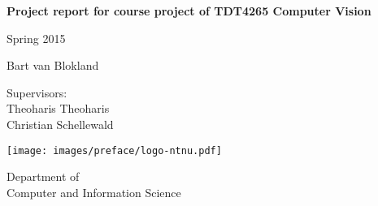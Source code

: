 \documentclass[12pt,a4paper,oneside]{report}
\begin{document}

\thispagestyle{empty}

\begin{center}
    {\Huge\textbf{Project report for course project of TDT4265 Computer Vision}} \\
    \medskip

    \vspace{2cm}

    \vspace{.7cm}

    {\large Spring 2015}\\

    \vspace{.7cm}

    {\large
    Bart van Blokland\\
    }

    \vspace{.7cm}

    {\large
    Supervisors:\\
    Theoharis Theoharis\\
    Christian Schellewald\\}

    \vspace{10cm}

    \texttt{[image: images/preface/logo-ntnu.pdf]}

    \large{Department of\\Computer and Information Science}

\end{center}

\newpage

\setcounter{tocdepth}{1}
\tableofcontents
\clearpage






\appendix
%
%


\end{document}

